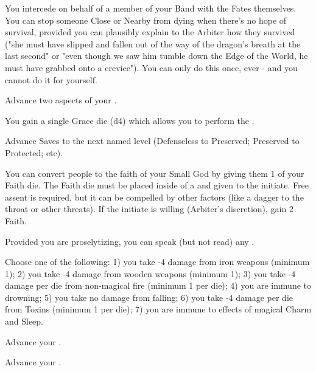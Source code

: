 \begin{multicols*}{2}
You intercede on behalf of a member of your Band with the Fates themselves.  You can stop someone Close or Nearby from dying when there's no hope of survival, provided you can plausibly explain to the Arbiter how they survived ("she must have slipped and fallen out of the way of the dragon's breath at the last second" or "even though we saw him tumble down the Edge of the World, he must have grabbed onto a crevice").  You can only do this once, ever - and you cannot do it for yourself. 


Advance two  aspects of your  \DCUP. 



You gain a single Grace die (d4) which allows you to perform the .


Advance  Saves to the next named level (Defenseless to Preserved; Preserved to Protected; etc).


You can convert people to the faith of your Small God by giving them 1 of your Faith die.  The Faith die must be placed inside of a  and given to the initiate. Free assent is required, but it can be compelled by other factors (like a dagger to the throat or other threats). If the initiate is willing (Arbiter's discretion), gain 2 Faith.

Provided you are proselytizing, you can speak (but not read) any .



\newpage





Choose one of the following: 1) you take -4 damage from iron weapons (minimum 1); 2) you take -4 damage from wooden weapons (minimum 1); 3) you take -4 damage per die from non-magical fire (minimum 1 per die); 4) you are immune to drowning; 5) you take no damage from falling; 6) you take -4 damage per die from Toxins (minimum 1 per die); 7) you are immune to effects of magical Charm and Sleep.


\cbreak




Advance your \JUJU \DCUP.


Advance your \JUJU \DCUP. 

\end{multicols*}


